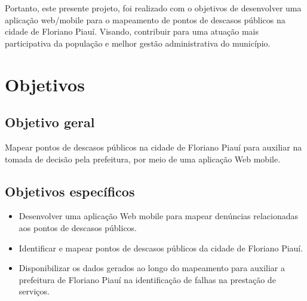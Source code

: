 \documentclass[12pt]{article}
\begin{document}
Portanto, este presente projeto, foi realizado com o objetivos de desenvolver uma aplicação web/mobile para o mapeamento de pontos de descasos públicos na cidade de Floriano Piauí. Visando, contribuir para uma atuação mais participativa da população e melhor gestão administrativa do município.

\section{Objetivos}
\subsection{Objetivo geral}
Mapear pontos de descasos públicos na cidade de Floriano Piauí para auxiliar na tomada de decisão pela prefeitura, por meio de uma aplicação Web mobile.
\subsection{Objetivos específicos}
\begin{itemize}
\item Desenvolver uma aplicação Web mobile para mapear denúncias relacionadas aos pontos de descasos públicos.
\item Identificar e mapear pontos de descasos públicos da cidade de Floriano Piauí.
\item Disponibilizar os dados gerados ao longo do mapeamento para auxiliar a\\ prefeitura de Floriano Piauí na identificação de falhas na prestação de serviços.
\end{itemize}
\end{document}
